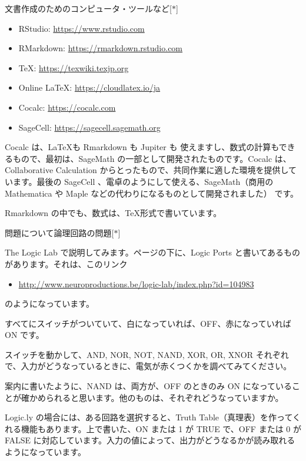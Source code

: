 \documentclass[10pt, dvipdfmx]{beamer}
\begin{document}
\begin{frame}{文書作成のためのコンピュータ・ツールなど\hfill [$\ast$]}
\begin{itemize}
\item RStudio: \url{https://www.rstudio.com}
\item RMarkdown: \url{https://rmarkdown.rstudio.com}
\item \TeX: \url{https://texwiki.texjp.org}
\item Online \LaTeX: \url{https://cloudlatex.io/ja}
\item Cocalc: \url{https://cocalc.com}
\item SageCell: \url{https://sagecell.sagemath.org}
\end{itemize}

\bigskip
Cocalc は、\LaTeX も Rmarkdown も Jupiter も 使えますし、数式の計算もできるもので、最初は、SageMath の一部として開発されたものです。Cocalc は、Collaborative Calculation からとったもので、共同作業に適した環境を提供しています。最後の SageCell 、電卓のようにして使える、SageMath（商用の Mathematica や Maple などの代わりになるものとして開発されました） です。

Rmarkdown の中でも、数式は、\TeX 形式で書いています。
\end{frame}
\begin{frame}{問題について}{論理回路の問題\hfill [$\ast$]}

The Logic Lab で説明してみます。ページの下に、Logic Ports と書いてあるものがあります。それは、このリンク
\begin{itemize}
\item  \url{http://www.neuroproductions.be/logic-lab/index.php?id=104983} 
 \end{itemize}
 のようになっています。
 
 \medskip
 すべてにスイッチがついていて、白になっていれば、OFF、赤になっていれば ON です。
 
 \medskip
スイッチを動かして、AND, NOR, NOT, NAND, XOR, OR, XNOR それぞれで、入力がどうなっているときに、電気が赤くつくかを調べてみてください。

\medskip
案内に書いたように、NAND は、両方が、OFF のときのみ ON になっていることが確かめられると思います。他のものは、それぞれどうなっていますか。

\medskip
Logic.ly の場合には、ある回路を選択すると、Truth Table（真理表）を作ってくれる機能もあります。上で書いた、ON または 1 が TRUE で、OFF または 0 が FALSE に対応しています。入力の値によって、出力がどうなるかが読み取れるようになっています。

\end{frame}
\end{document}
